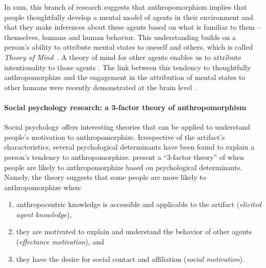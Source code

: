 \documentclass{frontiersSCNS} %
\begin{document}
In sum, this branch of research suggests that anthropomorphism implies that people thoughtfully develop a mental model of agents in their environment and that they make inferences about these agents based on what is familiar to them -- themselves, humans and human behavior. This understanding builds on a person's ability to attribute mental states to oneself and others, which is called \textit{Theory of Mind}~\citep{Premack1978}. A theory of mind for other agents enables us to attribute intentionality to those agents \citep{leslie_pretense_1987,admoni_multi-category_2012}. The link between this tendency to thoughtfully anthropomorphize and the engagement in the attribution of mental states to other humans were recently demonstrated at the brain level~\citep{cullen2013individual}.


\paragraph*{Social psychology research: a 3-factor theory of anthropomorphism\\}
\label{sec:psychological-factors}

Social psychology offers interesting theories that can be applied to understand people's motivation to anthropomorphize. Irrespective of the artifact's characteristics, several psychological determinants have been found to explain a person's tendency to anthropomorphize. \cite{epley_seeing_2007} present a ``3-factor theory'' of when people are likely to anthropomorphize based on psychological determinants. Namely, the theory suggests that some people are more likely to anthropomorphize when: 

\begin{enumerate}
	\item anthropocentric knowledge is accessible and applicable to the artifact (\textit{elicited agent knowledge}),
	\item they are motivated to explain and understand the behavior of other agents (\textit{effectance motivation}), and
	\item they have the desire for social contact and affiliation (\textit{social motivation}).
\end{enumerate}
\end{document}
